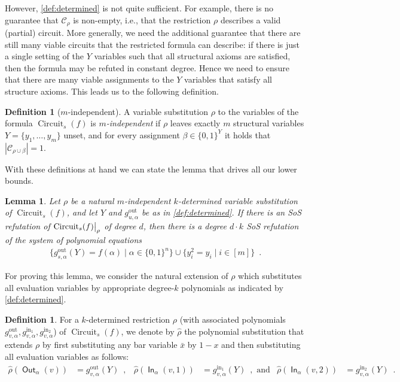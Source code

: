 \documentclass[10pt,a4paper]{article}
\theoremstyle{plain}
\newtheorem{lemma}[theorem]{Lemma}
\theoremstyle{remark}
\theoremstyle{definition}
\newtheorem{definition}[theorem]{Definition}
\newcommand{\eqcomma}{\enspace ,}
\newcommand{\eqperiod}{\enspace .}
\newcommand{\set}[1]{\{#1\}}
\newcommand\restrict[2]{{%
  \left.\kern-\nulldelimiterspace %
  #1 %
  \vphantom{\big|} %
  \right|_{#2} %
  }}
\newcommand{\calC}{\mathcal{C}}
\newcommand{\gout}{g^\mathrm{out}}
\newcommand{\ginone}{g^\mathrm{in_1}}
\newcommand{\gintwo}{g^\mathrm{in_2}}
\newcommand{\vars}[1]{\mathsf{#1}}
\DeclareMathOperator{\circuit}{Circuit}
\DeclareMathOperator{\outwire}{\vars{Out}}
\DeclareMathOperator{\inwire}{\vars{In}}
\begin{document}
However, \cref{def:determined} is not quite sufficient. For example,
there is no guarantee that $\calC_\rho$ is non-empty, i.e., that the
restriction $\rho$ describes a valid (partial) circuit. More generally, we
need the additional guarantee that there are still many viable
circuits that the restricted formula can describe: if there is just a
single setting of the $Y$ variables such that all structural axioms
are satisfied, then the formula may be refuted in constant
degree. Hence we need to ensure that there are many viable assignments
to the $Y$ variables that satisfy all structure axioms. This leads us
to the following definition.

\begin{definition}[$m$-independent]
  A variable substitution $\rho$ to the variables of the formula
  $\circuit_s(f)$ is \emph{$m$-independent} if $\rho$ leaves exactly
  $m$ structural variables $Y = \set{y_1, \ldots, y_m}$ unset, and for
  every assignment $\beta \in \set{0,1}^Y$ it holds that
  $|\calC_{\rho \cup \beta}| = 1$.
\end{definition}

With these definitions at hand we can state the lemma that drives all
our lower bounds.

\begin{lemma}
  \label{lem:circuit-to-poly}
  Let $\rho$ be a natural $m$-independent $k$-determined variable substitution
  of $\circuit_s(f)$, and let $Y$ and
  $\gout_{u, \alpha}$ be as in \cref{def:determined}. If there is an
  SoS refutation of $\restrict{\circuit_s(f)}{\rho}$ of degree $d$,
  then there is a degree $d \cdot k$ SoS refutation of the system
  of polynomial equations
  \begin{align}
    \label{eqn:lb transfer lemma}
    \set{
      \gout_{s,\alpha}(Y) = f(\alpha) \mid \alpha \in \set{0,1}^n
    }
    \cup
    \set{
      y_i^2 = y_i \mid i \in [m]
    } \eqperiod
  \end{align}
\end{lemma}


For proving this lemma, we consider the natural extension of $\rho$
which substitutes all evaluation variables by appropriate
degree-$k$ polynomials as indicated by \cref{def:determined}.

\begin{definition}
  For a $k$-determined restriction $\rho$ (with associated polynomials
  $\gout_{v,\alpha}, \ginone_{v,\alpha}, \gintwo_{v,\alpha}$) of
  $\circuit_s(f)$, we denote by $\hat\rho$ the polynomial substitution
  that extends $\rho$ by first substituting any bar variable $\bar x$
  by $1 - x$ and then substituting all evaluation variables as
  follows:
  \begin{align*}
    \hat\rho(\outwire_\alpha(v)) &=
    \gout_{v, \alpha}(Y) \eqcomma &
    \hat\rho(\inwire_\alpha(v, 1)) &= \ginone_{v,
    \alpha}(Y) \eqcomma \text{~and} &
    \hat\rho(\inwire_\alpha(v, 2)) &= \gintwo_{v,
    \alpha}(Y) \eqperiod
  \end{align*}
\end{definition}
\end{document}
